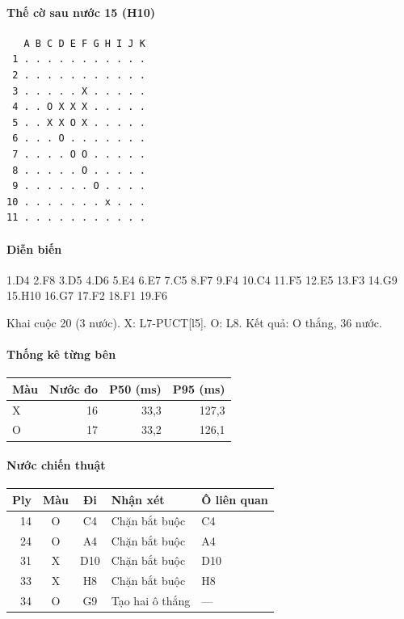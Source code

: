 \paragraph{Thế cờ sau nước 15 (H10)}
\begin{verbatim}
   A B C D E F G H I J K
 1 . . . . . . . . . . .
 2 . . . . . . . . . . .
 3 . . . . . X . . . . .
 4 . . O X X X . . . . .
 5 . . X X O X . . . . .
 6 . . . O . . . . . . .
 7 . . . . O O . . . . .
 8 . . . . . O . . . . .
 9 . . . . . . O . . . .
10 . . . . . . . x . . .
11 . . . . . . . . . . .
\end{verbatim}
\paragraph{Diễn biến}
{\footnotesize 1.D4 2.F8 3.D5 4.D6 5.E4 6.E7 7.C5 8.F7 9.F4 10.C4 11.F5 12.E5 13.F3 14.G9 15.H10 16.G7 17.F2 18.F1 19.F6\par}
Khai cuộc 20 (3 nước). X: L7-PUCT[l5]. O: L8. Kết quả: O thắng, 36 nước.
\paragraph{Thống kê từng bên}
\begin{center}\small
\begin{tabular}{@{}lrrr@{}}
\toprule
Màu & Nước đo & P50 (ms) & P95 (ms) \\
\midrule
X & 16 & 33,3 & 127,3 \\
O & 17 & 33,2 & 126,1 \\
\bottomrule
\end{tabular}
\end{center}
\paragraph{Nước chiến thuật}
\begin{center}\small
\begin{tabular}{@{}rccll@{}}
\toprule
Ply & Màu & Đi & Nhận xét & Ô liên quan \\
\midrule
14 & O & C4 & Chặn bắt buộc & C4 \\
24 & O & A4 & Chặn bắt buộc & A4 \\
31 & X & D10 & Chặn bắt buộc & D10 \\
33 & X & H8 & Chặn bắt buộc & H8 \\
34 & O & G9 & Tạo hai ô thắng & — \\
\bottomrule
\end{tabular}
\end{center}
